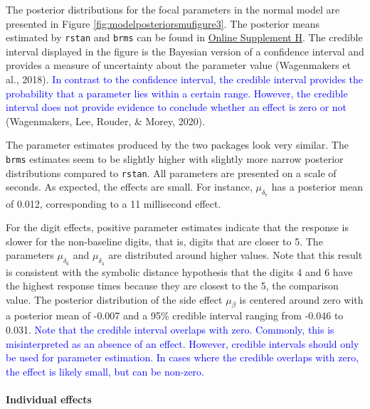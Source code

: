 \documentclass[
  english,
  doc,floatsintext]{apa6}
\let\oldparagraph\paragraph
\renewcommand{\paragraph}[1]{\oldparagraph{#1}\mbox{}}
\begin{document}
The posterior distributions for the focal parameters in the normal model are presented in Figure \ref{fig:modelposteriorsmufigure3}. The posterior means estimated by \texttt{rstan} and \texttt{brms} can be found in \href{https://github.com/MyrtheV/Bayesian-Hierarchical-Modelling-An-Introduction-and-Reassessment/tree/main/H\%20-\%20Posterior\%20Distributions\%20Tables}{Online Supplement H}. The credible interval displayed in the figure is the Bayesian version of a confidence interval and provides a measure of uncertainty about the parameter value (Wagenmakers et al., 2018). \textcolor{blue}{In contrast to the confidence interval, the credible interval provides the probability that a parameter lies within a certain range. However, the credible interval does not provide evidence to conclude whether an effect is zero or not }(Wagenmakers, Lee, Rouder, \& Morey, 2020).

The parameter estimates produced by the two packages look very similar. The \texttt{brms} estimates seem to be slightly higher with slightly more narrow posterior distributions compared to \texttt{rstan}. All parameters are presented on a scale of seconds. As expected, the effects are small. For instance, \(\mu_{\delta_{7}}\) has a posterior mean of 0.012, corresponding to a 11 millisecond effect.

For the digit effects, positive parameter estimates indicate that the response is slower for the non-baseline digits, that is, digits that are closer to 5. The parameters \(\mu_{\delta_{6}}\) and \(\mu_{\delta_{4}}\) are distributed around higher values. Note that this result is consistent with the symbolic distance hypothesis that the digits 4 and 6 have the highest response times because they are closest to the 5, the comparison value. The posterior distribution of the side effect \(\mu_{\beta}\) is centered around zero with a posterior mean of -0.007 and a 95\% credible interval ranging from -0.046 to 0.031. \textcolor{blue}{Note that the credible interval overlaps with zero. Commonly, this is misinterpreted as an absence of an effect. However, credible intervals should only be used for parameter estimation. In cases where the credible overlaps with zero,  the effect is likely small, but can be non-zero.}

\hypertarget{individual-effects}{%
\paragraph{Individual effects}\label{individual-effects}}
\end{document}
